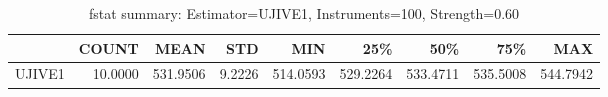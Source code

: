 \begin{table}[ht]
\centering
\caption{fstat summary: Estimator=UJIVE1, Instruments=100, Strength=0.60}
\begin{tabular}{lrrrrrrrr}
\toprule
 & COUNT & MEAN & STD & MIN & 25\% & 50\% & 75\% & MAX \\
\midrule
UJIVE1 & 10.0000 & 531.9506 & 9.2226 & 514.0593 & 529.2264 & 533.4711 & 535.5008 & 544.7942 \\
\bottomrule
\end{tabular}
\end{table}
